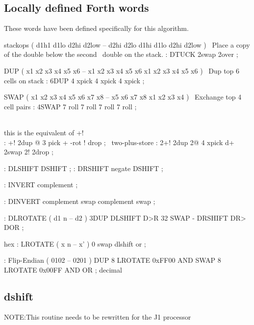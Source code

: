 \subsection{Locally defined Forth words}
These words have been defined specifically for this algorithm.
\begin{chunk}{stackops}
\DTUCK ( d1h1 d1lo d2hi d2low -- d2hi d2lo d1hi d1lo d2hi d2low )
\                         Place a copy of the double below the second
\                         double on the stack.
: DTUCK 2swap 2over ; 

\6DUP ( x1 x2 x3 x4 x5 x6 -- x1 x2 x3 x4 x5 x6 x1 x2 x3 x4 x5 x6 ) 
\            Dup top 6 cells on stack
: 6DUP 4 xpick 4 xpick 4 xpick ;

\4SWAP ( x1 x2 x3 x4 x5 x6 x7 x8 -- x5 x6 x7 x8 x1 x2 x3 x4 ) 
\                        Exchange top 4 cell pairs
: 4SWAP 7 roll 7 roll 7 roll 7 roll ;

\ \\ this is the equivalent of +! 
\ \\ : +! 2dup @ 3 pick + -rot ! drop ;
\ two-plus-store
: 2+! 2dup 2@ 4 xpick d+ 2swap 2! 2drop ;

: DLSHIFT DSHIFT ;
: DRSHIFT negate DSHIFT ;

: INVERT complement ;

: DINVERT complement swap complement swap ;

: DLROTATE           ( d1 n -- d2 )
    3DUP  DLSHIFT D>R  32 SWAP -  DRSHIFT DR>  DOR ;

hex
: LROTATE           ( x n -- x' )
  0 swap dlshift or ;

: Flip-Endian       ( 0102 -- 0201 )
    DUP 8 LROTATE 0xFF00 AND
    SWAP 8 LROTATE 0x00FF AND OR ;
decimal

\end{chunk}

\subsection{dshift}
NOTE:This routine needs to be rewritten for the J1 processor

